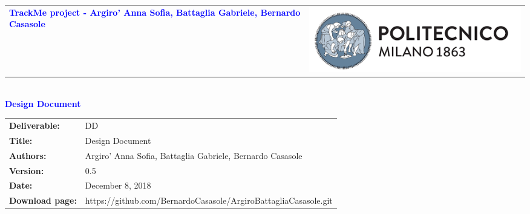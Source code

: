 




\begin{titlepage}


{\begin{table}[t!]
\centering
\begin{tabu} to \textwidth { X[1.3,r,p] X[1.7,l,p] }
\textcolor{Blue}{\textbf{\small{TrackMe project - Argiro' Anna Sofia, Battaglia Gabriele, Bernardo Casasole}}} & \includegraphics[scale=0.5]{images/PolimiLogo}
\end{tabu}
\end{table}}~\\ [7cm]


\centering
{\textcolor{Blue}{\textbf{\Huge{Design Document}}}} \\ [1cm]

\end{titlepage}

\begin{table}[h!]
\begin{tabu} to \textwidth { X[0.3,r,p] X[0.7,l,p] }
\hline

\textbf{Deliverable:} & DD\\
\textbf{Title:} & Design Document \\
\textbf{Authors:} & Argiro' Anna Sofia, Battaglia Gabriele, Bernardo Casasole \\
\textbf{Version:} & 0.5 \\
\textbf{Date:} & December 8, 2018 \\
\textbf{Download page:} & https://github.com/BernardoCasasole/ArgiroBattagliaCasasole.git \\
\hline
\end{tabu}
\end{table}

\setcounter{page}{2}

\newpage
{}
\tableofcontents

